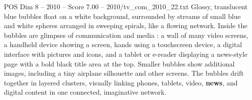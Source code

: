 \begin{textsample}{POS Dim 8 – 2010 – Score 7.00 – 2010/tv\_com\_2010\_22.txt}
Glossy, translucent blue bubbles float on a white background, surrounded by streams of small blue and white spheres arranged in sweeping spirals, like a flowing network.
Inside the bubbles are glimpses of communication and media : a wall of many video screens, a handheld device showing a screen, hands using a touchscreen device, a digital interface with pictures and icons, and a tablet or e-reader displaying a news-style page with a bold black title area at the top.
Smaller bubbles show additional images, including a tiny airplane silhouette and other screens.
The bubbles drift together in layered clusters, visually linking phones, tablets, video, \textbf{news}, and digital content in one connected, imaginative network.

\end{textsample}
